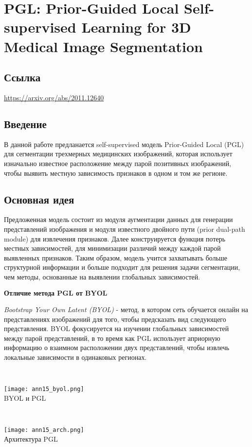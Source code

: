 \section{PGL: Prior-Guided Local Self-supervised Learning
for 3D Medical Image Segmentation}

\subsection*{Ссылка} \url{https://arxiv.org/abs/2011.12640}
\subsection*{Введение}
В данной работе предланается self-supervised модель Prior-Guided Local (PGL) 
для сегментации трехмерных медицинских изображений, которая использует изначально
известное расположение между парой позитивных изображений, чтобы выявить местную 
зависимость признаков в одном и том же регионе.
\subsection*{Основная идея}
Предложенная модель состоит из модуля аугментации данных для генерации 
представлений изображения и модуля известного двойного пути (prior dual-path module)
для извлечения признаков. Далее конструируется функция потерь местных зависимостей, 
для минимизации различий между каждой парой выявленных признаков. Таким образом, модель
учится захватывать больше структурной информации и больше подходит для решения задачи сегментации, 
чем методы, основанные на выявлении глобальных зависимостей. 
\par 
\textbf{Отличие метода PGL от BYOL} \par
\textit{Bootstrap Your Own Latent (BYOL)} - метод, в котором сеть 
обучается онлайн на представлениях изображений для того, чтобы предсказать вид
следующего представления. BYOL фокусируется на изучении глобальных зависимостей между 
парой представлений, в то время как PGL использует априорную информацию о
взаимном расположении двух представлений, чтобы извлечь локальные зависимости в одинаковых регионах.

\\
\begin{minipage}{1.0\linewidth}
    \begin{center}
        \texttt{[image: ann15\_byol.png]} \\
        \caption{\scriptsize{BYOL и PGL}}
    \end{center}
\end{minipage}
\\
\begin{minipage}{1.0\linewidth}
    \begin{center}
        \texttt{[image: ann15\_arch.png]} \\
        \caption{\scriptsize{Архитектура PGL}}
    \end{center}
\end{minipage}
